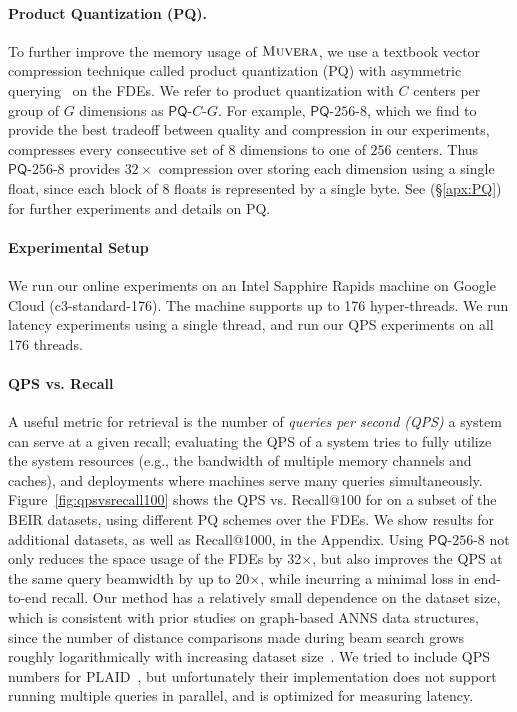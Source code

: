 \paragraph{Product Quantization (PQ).}
To further improve the memory usage of $\textsc{Muvera}$, we use a textbook vector compression technique called product quantization (PQ) with asymmetric querying~\cite{jegou2010product, guo2020accelerating} on the FDEs. %
We refer to product quantization with $C$ centers per group of $G$ dimensions as $\mathsf{PQ}\text{-}C\text{-}G$. For example, $\mathsf{PQ}\text{-}256\text{-}8$, which we find to provide the best tradeoff between quality and compression in our experiments, compresses every consecutive set of $8$ dimensions to one of $256$ centers. Thus $\mathsf{PQ}\text{-}256\text{-}8$  provides $32\times$ compression over storing each dimension using a single float, since each block of $8$ floats is represented by a single byte. See (§\ref{apx:PQ}) for further experiments and details on PQ.


\paragraph{Experimental Setup}
We run our online experiments on an Intel Sapphire Rapids machine on Google Cloud (c3-standard-176). The machine supports up to 176 hyper-threads. 
We run latency experiments using a single thread, and run our QPS experiments on all 176 threads.



\paragraph{QPS vs. Recall}
A useful metric for retrieval is the number of {\em queries per second (QPS)} a system can serve at a given recall; evaluating the QPS of a system tries to fully utilize the system resources (e.g., the bandwidth of multiple memory channels and caches), and deployments where machines serve many queries simultaneously. 
Figure~\ref{fig:qpsvsrecall100} shows the QPS vs. Recall@100 for \name{} on a subset of the BEIR datasets, using different PQ schemes over the FDEs. We show results for additional datasets, as well as Recall@1000, in the Appendix.
Using $\mathsf{PQ}\text{-}256\text{-}8$ not only reduces the space usage of the FDEs by 32$\times$, but also improves the QPS at the same query beamwidth by up to 20$\times$, while incurring a minimal loss in end-to-end recall.
Our method has a relatively small dependence on the dataset size, which is consistent with prior studies on graph-based ANNS data structures, since the number of distance comparisons made during beam search grows roughly logarithmically with increasing dataset size~\cite{parlayann, diskann}. 
We tried to include QPS numbers for PLAID~\cite{santhanam2022plaid}, but unfortunately their implementation does not support running multiple queries in parallel, and is optimized for measuring latency.



